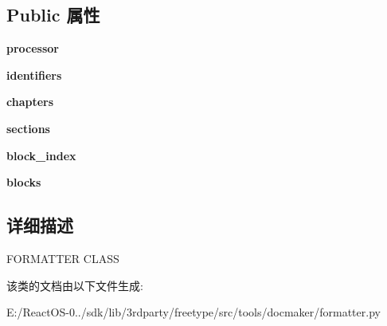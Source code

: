\subsection*{Public 属性}
\begin{DoxyCompactItemize}
\item 
\mbox{\label{classformatter_1_1_formatter_ae2749d08d9132dc7cd34427379a5d509}} 
{\bfseries processor}
\item 
\mbox{\label{classformatter_1_1_formatter_aed1ece16482952bf9ed882d1a97597dc}} 
{\bfseries identifiers}
\item 
\mbox{\label{classformatter_1_1_formatter_aa79ca0dbd39ba6cf5ce4e787e95d07f9}} 
{\bfseries chapters}
\item 
\mbox{\label{classformatter_1_1_formatter_ad60df56db8782706517cfa7ec2258a49}} 
{\bfseries sections}
\item 
\mbox{\label{classformatter_1_1_formatter_ae5b78f7e0c14c6213214213b8d16bce1}} 
{\bfseries block\+\_\+index}
\item 
\mbox{\label{classformatter_1_1_formatter_a5a81eeb6edbdce38cc24a725af352606}} 
{\bfseries blocks}
\end{DoxyCompactItemize}


\subsection{详细描述}
F\+O\+R\+M\+A\+T\+T\+ER C\+L\+A\+SS 

该类的文档由以下文件生成\+:\begin{DoxyCompactItemize}
\item 
E\+:/\+React\+O\+S-\/0../sdk/lib/3rdparty/freetype/src/tools/docmaker/formatter.\+py\end{DoxyCompactItemize}
